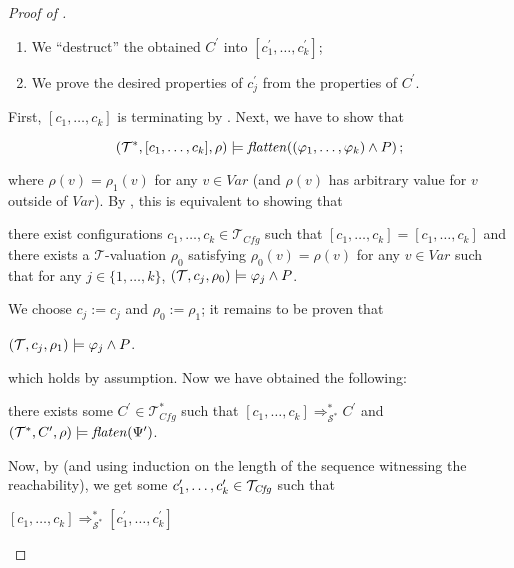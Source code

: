 \begin{proof}[Proof of ]
\begin{enumerate}
\begin{enumerate}
\begin{enumerate}
        \end{enumerate}
        \item We ``destruct'' the obtained $C^\prime$ into $[c^\prime_1,\ldots,c^\prime_k]$;
        \item We prove the desired properties of $c^\prime_j$ from the properties of $C^\prime$.
    \end{enumerate}
    First, $[c_1,\ldots,c_k]$ is terminating by .
    Next, we have to show that
    \begin{proofenv}
        \begin{equation*}
            (\mathcal{T}^*, [c_1,\ldots,c_k], \rho) \models \mathit{flatten}((\varphi_1,\ldots,\varphi_k) \land P) \, ;
        \end{equation*}
    \end{proofenv}
    where $\rho(v) = \rho_1(v)$ for any $v \in \mathit{Var}$ (and $\rho(v)$ has arbitrary value for $v$ outside of $\mathit{Var}$).
    By , this is equivalent to showing that
    \begin{proofenv}
        there exist configurations $c_1, \ldots, c_k \in \mathcal{T}_{\mathit{Cfg}}$ such that
        $[c_1, \ldots, c_k] = [c_1, \ldots, c_k]$ and there exists a $\mathcal{T}$-valuation $\rho_0$
        satisfying $\rho_0(v) = \rho(v)$ for any $v \in \mathit{Var}$
        such that for any $j \in \{ 1, \ldots, k \}$, $(\mathcal{T}, c_j, \rho_0) \models \varphi_j \land P$.
    \end{proofenv}
    We choose $c_j := c_j$ and $\rho_0 := \rho_1$; it remains to be proven that
    \begin{proofenv}
        $(\mathcal{T}, c_j, \rho_1) \models \varphi_j \land P$.    
    \end{proofenv}
    which holds by assumption.
    Now we have obtained the following:
    \begin{proofenv}
        there exists some $C^\prime \in \mathcal{T}_{\mathit{Cfg}}^*$ such that
        $[c_1,\ldots,c_k] \Rightarrow_{\mathcal{S}^*}^* C^\prime$
        and $(\mathcal{T}^*, C^\prime, \rho) \models \mathit{flaten}(\Psi^\prime)$.
    \end{proofenv}
    Now, by  (and using induction on the length of the
    sequence witnessing the reachability),
    we get some $c^\prime_1,\ldots,c^\prime_k \in \mathcal{T}_{\mathit{Cfg}}$ such that
    \begin{proofenv}
        $[c_1,\ldots,c_k] \Rightarrow_{\mathcal{S}^*}^* [c^\prime_1,\ldots,c^\prime_k]$

\end{proofenv}
\end{enumerate}
\end{proof}
